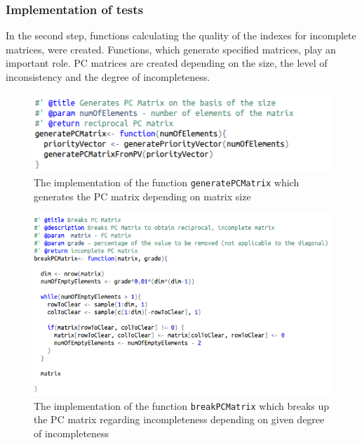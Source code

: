 \newpage
\subsubsection{Implementation of tests}
In the second step, functions calculating the quality of the indexes for incomplete matrices, were created. Functions, which generate specified matrices, play an important role. PC matrices are created depending on the size, the level of inconsistency and the degree of incompleteness.

\begin{figure}[h]
\centerline{\includegraphics[scale=0.75]{images/kod11.png}}
\caption{The implementation of the function \texttt{generatePCMatrix} which generates the PC matrix depending on matrix size}
\label{fig:rstudio}
\end{figure}

\begin{figure}[h]
\centerline{\includegraphics[scale=0.73]{images/kod13.png}}
\caption{The implementation of the function \texttt{breakPCMatrix} which breaks up the PC matrix regarding incompleteness depending on given degree of incompleteness}
\label{fig:rstudio}
\end{figure}


